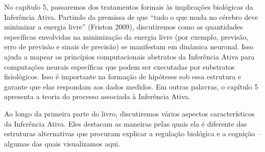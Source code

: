 \documentclass[
  12pt,
]{book}
\begin{document}
No capítulo 5, passaremos dos tratamentos formais às implicações biológicas da Inferência Ativa. Partindo da premissa de que ``tudo o que muda no cérebro deve minimizar a energia livre'' (Friston 2009), discutiremos como as quantidades específicas envolvidas na minimização da energia livre (por exemplo, previsão, erro de previsão e sinais de precisão) se manifestam em dinâmica neuronal. Isso ajuda a mapear os princípios computacionais abstratos da Inferência Ativa para computações neurais específicas que podem ser executadas por substratos fisiológicos. Isso é importante na formação de hipóteses sob essa estrutura e garante que elas respondam aos dados medidos. Em outras palavras, o capítulo 5 apresenta a teoria do processo associada à Inferência Ativa.

Ao longo da primeira parte do livro, discutiremos vários aspectos característicos da Inferência Ativa. Eles destacam as maneiras pelas quais ela é diferente das estruturas alternativas que procuram explicar a regulação biológica e a cognição -- algumas das quais visualizamos aqui.
\end{document}
